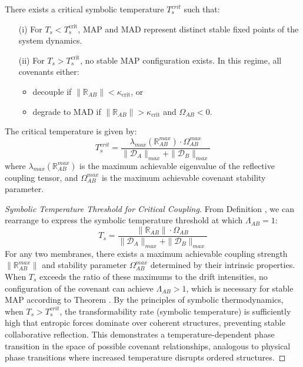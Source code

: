 \begin{theorem} \label{theorem:bk5_map_mad_critical_temperature} 
There exists a critical symbolic temperature $T_s^{crit}$ such that:
\begin{enumerate}
  \item[(i)] For \( T_s < T_s^{\text{crit}} \), MAP and MAD represent distinct stable fixed points of the system dynamics.
  \item[(ii)] For \( T_s > T_s^{\text{crit}} \), no stable MAP configuration exists. 
  In this regime, all covenants either:
  \begin{itemize}
    \item decouple if \( \|\mathbb{R}_{AB}\| < \kappa_{\text{crit}} \), or
    \item degrade to MAD if \( \|\mathbb{R}_{AB}\| > \kappa_{\text{crit}} \) and \( \Omega_{AB} < 0 \).
  \end{itemize}
\end{enumerate}
The critical temperature is given by:
\begin{equation}
T_s^{crit} = \frac{\lambda_{max}(\mathbb{R}_{AB}^{max}) \cdot \Omega_{AB}^{max}}{\|\mathcal{D}_A\|_{max} + \|\mathcal{D}_B\|_{max}}
\end{equation}
\noindent where $\lambda_{max}(\mathbb{R}_{AB}^{max})$ is the maximum achievable eigenvalue of the reflective coupling tensor, and $\Omega_{AB}^{max}$ is the maximum achievable covenant stability parameter.
\end{theorem}
\begin{proof}[Symbolic Temperature Threshold for Critical Coupling]
\label{proof:bk5_symbolic_temperature_threshold}
From Definition , we can rearrange to express the symbolic temperature threshold at which $\Lambda_{AB} = 1$:
\begin{equation}
T_s = \frac{\|\mathbb{R}_{AB}\| \cdot \Omega_{AB}}{\|\mathcal{D}_A\|_{max} + \|\mathcal{D}_B\|_{max}}
\end{equation}
For any two membranes, there exists a maximum achievable coupling strength $\|\mathbb{R}_{AB}^{max}\|$ and stability parameter $\Omega_{AB}^{max}$ determined by their intrinsic properties. When $T_s$ exceeds the ratio of these maximums to the drift intensities, no configuration of the covenant can achieve $\Lambda_{AB} > 1$, which is necessary for stable MAP according to Theorem .
By the principles of symbolic thermodynamics, when $T_s > T_s^{crit}$, the transformability rate (symbolic temperature) is sufficiently high that entropic forces dominate over coherent structures, preventing stable collaborative reflection. 
This demonstrates a temperature-dependent phase transition in the space of possible covenant relationships, analogous to physical phase transitions where increased temperature disrupts ordered structures.
\end{proof}
